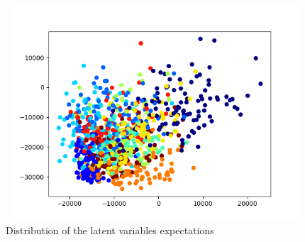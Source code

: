 \documentclass[10pt]{article}
\begin{document}
\begin{enumerate}
  \begin{figure}[ht]
    \centering
    \includegraphics[width=15cm, height=8cm]{./programming/q7.png}
    \caption{Distribution of the latent variables expectations }
  \end{figure}

\end{enumerate}
\end{document}
